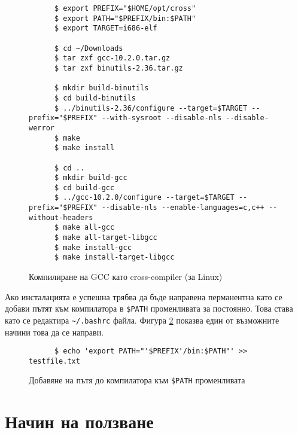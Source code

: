   \begin{figure}[ht]
    \centering
    \begin{verbatim}
      $ export PREFIX="$HOME/opt/cross"
      $ export PATH="$PREFIX/bin:$PATH"
      $ export TARGET=i686-elf

      $ cd ~/Downloads
      $ tar zxf gcc-10.2.0.tar.gz
      $ tar zxf binutils-2.36.tar.gz

      $ mkdir build-binutils
      $ cd build-binutils
      $ ../binutils-2.36/configure --target=$TARGET --prefix="$PREFIX" --with-sysroot --disable-nls --disable-werror
      $ make
      $ make install

      $ cd ..
      $ mkdir build-gcc
      $ cd build-gcc
      $ ../gcc-10.2.0/configure --target=$TARGET --prefix="$PREFIX" --disable-nls --enable-languages=c,c++ --without-headers
      $ make all-gcc
      $ make all-target-libgcc
      $ make install-gcc
      $ make install-target-libgcc
    \end{verbatim}
    \caption{Компилиране на GCC като cross-compiler (за Linux)}
    \label{fig:compiling-gcc}
  \end{figure}

  Ако инсталацията е успешна трябва да бъде направена перманентна като се добави пътят към компилатора в {\tt \$PATH} променливата за постоянно. Това става като се редактира {\tt \~{}/.bashrc} файла. Фигура \ref{fig:adding-to-path} показва един от възможните начини това да се направи.

  \begin{figure}[ht]
    \centering
    \begin{verbatim}
      $ echo 'export PATH="'$PREFIX'/bin:$PATH"' >> testfile.txt
    \end{verbatim}
    \caption{Добавяне на пътя до компилатора към {\tt \$PATH} променливата}
    \label{fig:adding-to-path}
  \end{figure}

  \section{Начин на ползване}
